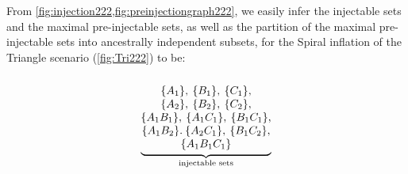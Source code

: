 {From \cref{fig:injection222,fig:preinjectiongraph222}, we easily infer the injectable sets and the maximal pre-injectable sets, as well as the partition of the maximal pre-injectable sets into ancestrally independent subsets, for the  Spiral inflation of the Triangle scenario (\cref{fig:Tri222}) to be:
\begin{align}\label{eq:basicsetup222}
{\underbrace{\begin{matrix}
\, \\
\brackets{A_1},\:\brackets{B_1},\:\brackets{C_1},\\
\brackets{A_2},\:\brackets{B_2},\:\brackets{C_2},\\
\brackets{A_1 B_1},\:\brackets{A_1 C_1},\:\brackets{B_1 C_1},\\
\brackets{A_1 B_2}.\:\brackets{A_2 C_1},\:\brackets{B_1 C_2},\\
\brackets{A_1 B_1 C_1}
\end{matrix}}_{\substack{\text{injectable sets}}}}

\end{align}}
